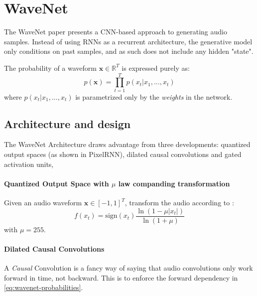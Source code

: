 \section{WaveNet}
The WaveNet paper presents a CNN-based approach to generating audio samples. \cite{oord_wavenet_2016}
Instead of using RNNs as a recurrent architecture, the generative model only conditions on past samples, and as such does not include any hidden "state".

The probability of a waveform \(\mathbf{x}\in \mathbb{R}^T\) is expressed purely as:
\begin{equation}\label{eq:wavenet-probabilities}
    p(\mathbf{x}) = \prod_{t=1}^T  p(x_t | x_1, ..., x_t )
\end{equation}
where $ p(x_t | x_1, ..., x_t ) $ is parametrized only by the \textit{weights} in the network. 


\subsection{Architecture and design}
The WaveNet Architecture draws advantage from three developments: quantized output spaces (as shown in PixelRNN), dilated causal convolutions and gated activation units,

\paragraph{Quantized Output Space with $\mu$ law companding transformation}
Given an audio waveform \(\mathbf{x} \in [-1,1]^T\), transform the audio according to :
\begin{equation}
    f(x_t) = \textrm{sign}(x_t) \frac{ \ln(1 - \mu|x_t|  )}{ \ln(1 + \mu)  }
\end{equation} 
with \(\mu = 255\).


\paragraph{Dilated Causal Convolutions}
A \textit{Causal} Convolution is a fancy way of saying that audio convolutions only work forward in time, not backward.
This is to enforce the forward dependency in \cref{eq:wavenet-probabilities}.

